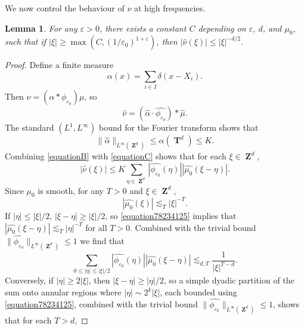 \documentclass[12pt,reqno]{article}
\numberwithin{equation}{section}
\DeclareMathOperator{\ZZ}{\mathbf{Z}}
\DeclareMathOperator{\TT}{\mathbf{T}}
\newtheorem{lemma}[theorem]{Lemma}
\begin{document}
We now control the behaviour of $\nu$ at high frequencies.

\begin{lemma} \label{lemma6213}
    For any $\varepsilon > 0$, there exists a constant $C$ depending on $\varepsilon$, $d$, and $\mu_0$, such that if $|\xi| \geq \max( C, (1/\varepsilon_0)^{1 + \varepsilon})$, then $|\widehat{\nu}(\xi)| \leq |\xi|^{-d/2}$.
\end{lemma}
\begin{proof}
    Define a finite measure
    \[ \alpha(x) = \sum_{i \in I} \delta \left( x - X_i \right). \]
    Then $\nu = (\alpha * \phi_{\varepsilon_0}) \mu$, so
    \begin{equation} \label{equationB}
        \widehat{\nu} = \left(\widehat{\alpha} \cdot \widehat{\phi_{\varepsilon_0}} \right) * \widehat{\mu}.
    \end{equation}
    The standard $(L^1,L^\infty)$ bound for the Fourier transform shows that
    \begin{equation} \label{equationC}
        \| \widehat{\alpha} \|_{L^\infty(\ZZ^d)} \leq \alpha(\TT^d) \leq K.
    \end{equation}
    Combining \eqref{equationB} with \eqref{equationC} shows that for each $\xi \in \ZZ^d$,
    \begin{equation} \label{equationBGQPS23}
        |\widehat{\nu}(\xi)| \leq K \sum_{\eta \in \ZZ^d} |\widehat{\phi_{\varepsilon_0}}(\eta)| |\widehat{\mu_0}(\xi-\eta)|.
    \end{equation}
    Since $\mu_0$ is smooth, for any $T > 0$ and $\xi \in \ZZ^d$,
    \begin{equation} \label{equation78234125}
        |\widehat{\mu_0}(\xi)| \lesssim_T |\xi|^{-T}.
    \end{equation}
    If $|\eta| \leq |\xi|/2$, $|\xi - \eta| \geq |\xi|/2$, so \eqref{equation78234125} implies that $|\widehat{\mu_0}(\xi - \eta)| \lesssim_T |\eta|^{-T}$ for all $T > 0$. Combined with the trivial bound $\| \widehat{\phi_{\varepsilon_0}} \|_{L^\infty(\ZZ^d)} \leq 1$ we find that
    \begin{equation} \label{equation12412AGEIVOOV}
        \sum_{0 \leq |\eta| \leq |\xi|/2} |\widehat{\phi_{\varepsilon_0}}(\eta)| |\widehat{\mu_0}(\xi-\eta)| \lesssim_{d,T} \frac{1}{|\xi|^{T-d}}.
    \end{equation}
    Conversely, if $|\eta| \geq 2 |\xi|$, then $|\xi - \eta| \geq |\eta|/2$, so a simple dyadic partition of the sum onto annular regions where $|\eta| \sim 2^k |\xi|$, each bounded using \eqref{equation78234125}, combined with the trivial bound $\| \widehat{\phi_{\varepsilon_0}} \|_{L^\infty(\ZZ^d)} \leq 1$, shows that for each $T > d$,

\end{proof}
\end{document}
